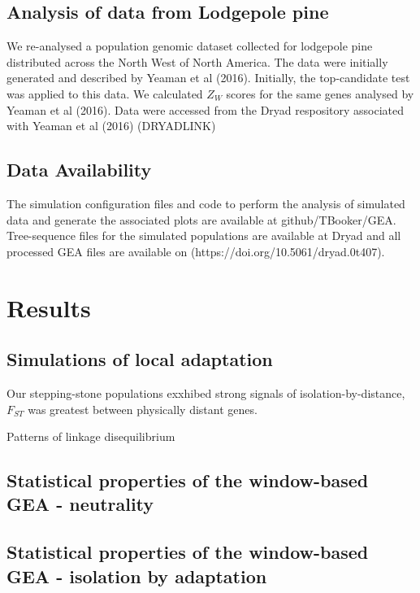 \documentclass[11pt,twoside,lineno]{GSA_format}
\begin{document}
\subsection{Analysis of data from Lodgepole pine}

We re-analysed a population genomic dataset collected for lodgepole pine distributed across the North West of North America. The data were initially generated and described by Yeaman et al (2016). Initially, the top-candidate test was applied to this data. We calculated $Z_W$ scores for the same genes analysed by Yeaman et al (2016). Data were accessed from the Dryad respository associated with Yeaman et al (2016) (DRYADLINK)

\subsection{Data Availability}

The simulation configuration files and code to perform the analysis of simulated data and generate the associated plots are available at github/TBooker/GEA. Tree-sequence files for the simulated populations are available at Dryad and all processed GEA files are available on (https://doi.org/10.5061/dryad.0t407). 

\section{Results}

\subsection{Simulations of local adaptation}

Our stepping-stone populations exxhibed strong signals of isolation-by-distance,  $F_{ST}$ was greatest between physically distant genes. 

Patterns of linkage disequilibrium

\subsection{Statistical properties of the window-based GEA - neutrality}

\subsection{Statistical properties of the window-based GEA - isolation by adaptation}
\end{document}
